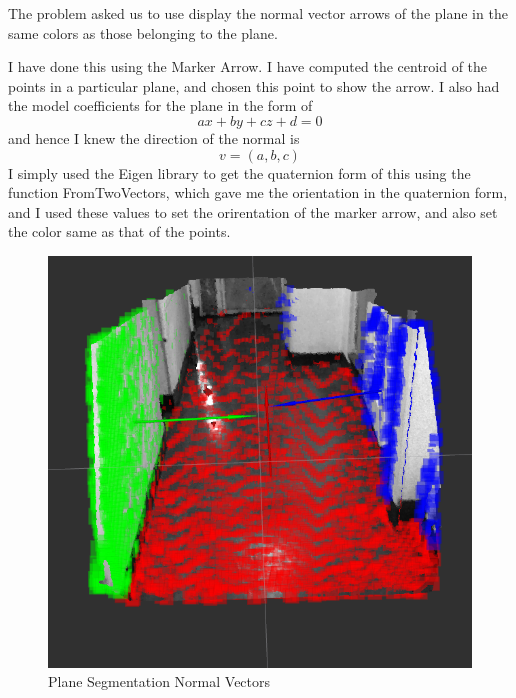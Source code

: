\documentclass{article}
\begin{document}
The problem asked us to use display the normal vector arrows of the plane in the same colors as those belonging to the plane.

I have done this using the Marker Arrow. I have computed the centroid of the points in a particular plane, and chosen this point to show the arrow. I also had the model coefficients for the plane in the form of $$ax + by + cz + d = 0$$ and hence I knew the direction of the normal is $$v = (a,b,c)$$ I simply used the Eigen library to get the quaternion form of this using the function FromTwoVectors, which gave me the orientation in the quaternion form, and I used these values to set the orirentation of the marker arrow, and also set the color same as that of the points.

\begin{figure}[H]
  \centering
  \includegraphics[scale=0.5]{images/rviz_screenshot_2016_12_29-11_25_46}
  \caption{Plane Segmentation Normal Vectors}
  \label{Fig:1}
\end{figure}
\end{document}
